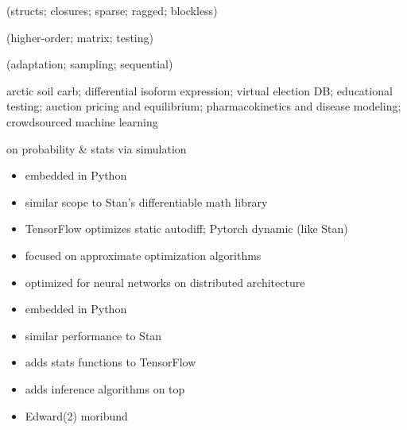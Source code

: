 \documentclass[10pt]{report}
\begin{document}
\begin{subitemize}
\item {} (structs; closures; sparse; ragged; blockless)
\item {} (higher-order; matrix; testing)
\item {} (adaptation; sampling; sequential)
\item {}
\begin{subitemize}
\item arctic soil carb; differential isoform expression; virtual election DB;
educational testing; auction pricing and equilibrium; pharmacokinetics and
disease modeling; crowdsourced machine learning
\end{subitemize}
\item {} on probability \& stats via simulation
\end{subitemize}




\begin{itemize}
\item embedded in Python
\item similar scope to Stan's differentiable math library
\item TensorFlow optimizes static autodiff; Pytorch dynamic (like Stan)
\item focused on approximate optimization algorithms
\item optimized for neural networks on distributed architecture
\end{itemize}

\begin{itemize}
\item embedded in Python
\item similar performance to Stan
\item adds stats functions to TensorFlow
\item adds inference algorithms on top
\item Edward(2) moribund
\end{itemize}
\end{document}
